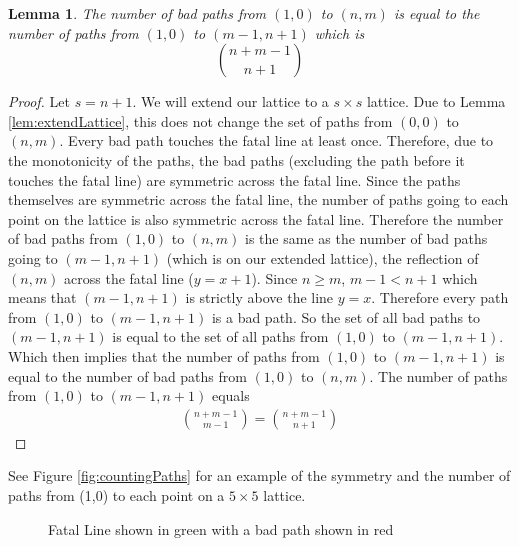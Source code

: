 \documentclass[letterpaper, 12pt]{article}
\newtheorem{lemma}[theorem]{Lemma}
\begin{document}
\begin{lemma}\label{lem:badPathEq}
    The number of bad paths from $(1,0)$ to $(n,m)$ is equal to the number of paths from $(1,0)$ to $(m-1,n+1)$ which is $$\binom{n+m-1}{n+1}$$
\end{lemma}
\begin{proof}
    Let $s=n+1$. We will extend our lattice to a $s\times s$ lattice. Due to Lemma \ref{lem:extendLattice}, this does not change the set of paths from $(0,0)$ to $(n,m)$. Every bad path touches the fatal line at least once. Therefore, due to the monotonicity of the paths, the bad paths (excluding the path before it touches the fatal line) are symmetric across the fatal line. Since the paths themselves are symmetric across the fatal line, the number of paths going to each point on the lattice is also symmetric across the fatal line. Therefore the number of bad paths from $(1,0)$ to $(n,m)$ is the same as the number of bad paths going to $(m-1,n+1)$ (which is on our extended lattice), the reflection of $(n,m)$ across the fatal line ($y=x+1$). Since $n\geq m$, $m-1 < n+1$ which means that $(m-1,n+1)$ is strictly above the line $y=x$. Therefore every path from $(1,0)$ to $(m-1,n+1)$ is a bad path. So the set of all bad paths to $(m-1,n+1)$ is equal to the set of all paths from $(1,0)$ to $(m-1,n+1)$. Which then implies that the number of paths from $(1,0)$ to $(m-1,n+1)$ is equal to the number of bad paths from $(1,0)$ to $(n,m)$. The number of paths from $(1,0)$ to $(m-1,n+1)$ equals
    \begin{align*}
        \binom{n+m-1}{m-1} = \binom{n+m-1}{n+1}
    \end{align*}
\end{proof}
See Figure \ref{fig:countingPaths} for an example of the symmetry and the number of paths from (1,0) to each point on a $5\times5$ lattice.
\newpage
\begin{figure}[t]
    \centering
    \caption{Fatal Line shown in green with a bad path shown in red}
    \label{fig:fatalLine}
\end{figure}
\end{document}
